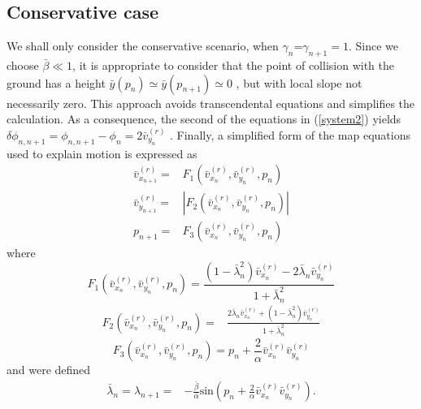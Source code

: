 \documentclass[reprint, aps, pre,nofootinbib]{revtex4-1}
\begin{document}
\subsection{Conservative case}

We shall only consider the conservative scenario, when $\gamma_{n}$=$\gamma_{n+1}=1$.
Since we choose $\bar{\beta}\ll1$, it is appropriate to consider
that the point of collision with the ground has a height $\bar{y}(p_{n})\simeq\bar{y}(p_{n+1})\simeq0$
, but with local slope not necessarily zero. This approach avoids
transcendental equations and simplifies the calculation. As a consequence,
the second of the equations in (\ref{system2}) yields $\delta\phi_{n,n+1}=\phi_{n,n+1}-\phi_{n}=2\bar{v}_{y_{n}}^{(r)}$
. Finally, a simplified form of the map equations used to explain
motion is expressed as{\small{}
\begin{equation}
\begin{split}\bar{v}_{x_{n+1}}^{(r)}= & F_{1}\left(\bar{v}_{x_{n}}^{(r)},\bar{v}_{y_{n}}^{(r)},p_{n}\right)\\
\bar{v}_{y_{n+1}}^{(r)}= & \left|F_{2}\left(\bar{v}_{x_{n}}^{(r)},\bar{v}_{y_{n}}^{(r)},p_{n}\right)\right|\\
p_{n+1}= & F_{3}\left(\bar{v}_{x_{n}}^{(r)},\bar{v}_{y_{n}}^{(r)},p_{n}\right)
\end{split}
\label{map3-1}
\end{equation}
where
\begin{equation}
F_{1}\left(\bar{v}_{x_{n}}^{(r)},\bar{v}_{y_{n}}^{(r)},p_{n}\right)=\frac{\left(1-\bar{\lambda}_{n}^{2}\right)\bar{v}_{x_{n}}^{(r)}-2\bar{\lambda}_{n}\bar{v}_{y_{n}}^{(r)}}{1+\bar{\lambda}_{n}^{2}}
\end{equation}
\begin{equation}
\begin{split}F_{2}\left(\bar{v}_{x_{n}}^{(r)},\bar{v}_{y_{n}}^{(r)},p_{n}\right)= & \frac{2\bar{\lambda}_{n}\bar{v}_{x_{n}}^{(r)}+\left(1-\bar{\lambda}_{n}^{2}\right)\bar{v}_{y_{n}}^{(r)}}{1+\bar{\lambda}_{n}^{2}}\end{split}
\label{map3-2}
\end{equation}
\begin{equation}
F_{3}\left(\bar{v}_{x_{n}}^{(r)},\bar{v}_{y_{n}}^{(r)},p_{n}\right)=p_{n}+\frac{2}{\alpha}\bar{v}_{x_{n}}^{(r)}\bar{v}_{y_{n}}^{(r)}
\end{equation}
and were defined}{\footnotesize{}
\begin{equation}
\begin{split}\bar{\lambda}_{n}=\lambda_{n+1}= & -\frac{\bar{\beta}}{\bar{\alpha}}\textrm{sin}\left(p_{n}+\frac{2}{\alpha}\bar{v}_{x_{n}}^{(r)}\bar{v}_{y_{n}}^{(r)}\right).\end{split}
\label{map3-3}
\end{equation}
}{\footnotesize\par}
\end{document}
